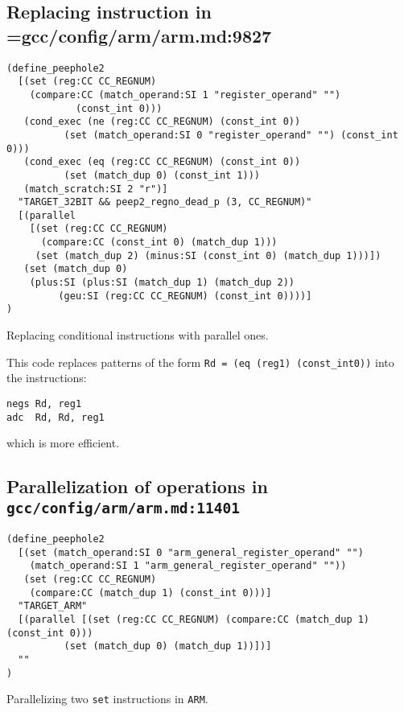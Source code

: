 \documentclass[11pt]{article}
\begin{document}
\subsection{Replacing instruction in =gcc/config/arm/arm.md:9827}
\begin{listing}[H]
\begin{verbatim}
(define_peephole2
  [(set (reg:CC CC_REGNUM)
	(compare:CC (match_operand:SI 1 "register_operand" "")
		    (const_int 0)))
   (cond_exec (ne (reg:CC CC_REGNUM) (const_int 0))
	      (set (match_operand:SI 0 "register_operand" "") (const_int 0)))
   (cond_exec (eq (reg:CC CC_REGNUM) (const_int 0))
	      (set (match_dup 0) (const_int 1)))
   (match_scratch:SI 2 "r")]
  "TARGET_32BIT && peep2_regno_dead_p (3, CC_REGNUM)"
  [(parallel
    [(set (reg:CC CC_REGNUM)
	  (compare:CC (const_int 0) (match_dup 1)))
     (set (match_dup 2) (minus:SI (const_int 0) (match_dup 1)))])
   (set (match_dup 0)
	(plus:SI (plus:SI (match_dup 1) (match_dup 2))
		 (geu:SI (reg:CC CC_REGNUM) (const_int 0))))]
)
\end{verbatim}
\caption{Replacing conditional instructions with parallel ones.}
\end{listing}

This code replaces patterns of the form \verb|Rd = (eq (reg1) (const_int0))|
into the instructions:
\begin{listing}[H]
\begin{verbatim}
negs Rd, reg1
adc  Rd, Rd, reg1
\end{verbatim}
\end{listing}

which is more efficient.

\subsection{Parallelization of operations in \texttt{gcc/config/arm/arm.md:11401}}
\begin{listing}
\begin{verbatim}
(define_peephole2
  [(set (match_operand:SI 0 "arm_general_register_operand" "")
	(match_operand:SI 1 "arm_general_register_operand" ""))
   (set (reg:CC CC_REGNUM)
	(compare:CC (match_dup 1) (const_int 0)))]
  "TARGET_ARM"
  [(parallel [(set (reg:CC CC_REGNUM) (compare:CC (match_dup 1) (const_int 0)))
	      (set (match_dup 0) (match_dup 1))])]
  ""
)
\end{verbatim}
\caption{Parallelizing two \texttt{set} instructions in \texttt{ARM}.}
\end{listing}
\end{document}
